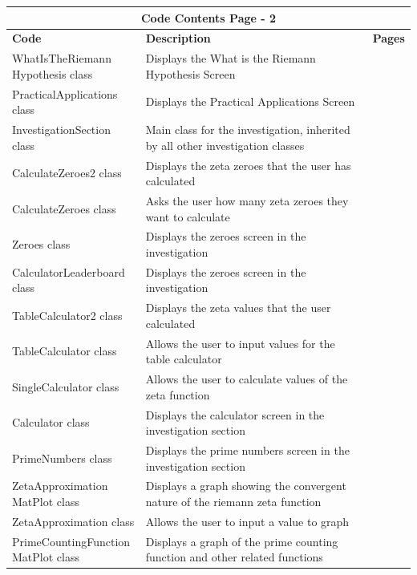\documentclass{article}
\begin{document}
\begin{table}[ht]
    \centering
    \begin{tabular}{ | p{0.33\linewidth} | p{0.57\linewidth} | p{0.1\linewidth} |}
    \hline
    \multicolumn{3}{|c|}{\textbf{Code Contents Page - 2}}\\
    \hline
    \hline
    \textbf{Code} & \textbf{Description} & \textbf{Pages}\\
    \hline
    WhatIsTheRiemann \text{ }  \text{ } \text{ } Hypothesis class & Displays the What is the Riemann Hypothesis Screen & \\
    \hline
    PracticalApplications class & Displays the Practical Applications Screen & \\
    \hline
    InvestigationSection class & Main class for the investigation, inherited by all other investigation classes& \\
    \hline
    CalculateZeroes2 class & Displays the zeta zeroes that the user has calculated & \\
    \hline
    CalculateZeroes class & Asks the user how many zeta zeroes they want to calculate & \\
    \hline
    Zeroes class & Displays the zeroes screen in the investigation & \\
    \hline
    CalculatorLeaderboard class & Displays the zeroes screen in the investigation & \\
    \hline
    TableCalculator2 class & Displays the zeta values that the user calculated& \\
    \hline
    TableCalculator class & Allows the user to input values for the table calculator & \\
    \hline
    SingleCalculator class & Allows the user to calculate values of the zeta function & \\
    \hline
    Calculator class & Displays the calculator screen in the investigation section& \\
    \hline
    PrimeNumbers class & Displays the prime numbers screen in the investigation section& \\
    \hline
    ZetaApproximation \text{ } \text{ } MatPlot class & Displays a graph showing the convergent  nature of the riemann zeta function& \\
    \hline
    ZetaApproximation class & Allows the user to input a value to graph & \\
    \hline
    PrimeCountingFunction MatPlot class & Displays a graph of the prime counting function and other related functions & \\

\end{tabular}
\end{table}
\end{document}
